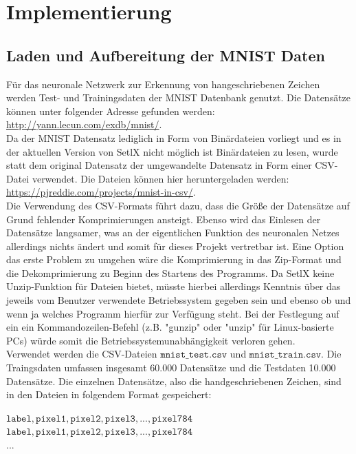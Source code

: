 \chapter{Implementierung}

\section{Laden und Aufbereitung der MNIST Daten}
Für das neuronale Netzwerk zur Erkennung von hangeschriebenen Zeichen werden Test- und Trainingsdaten der MNIST Datenbank genutzt. Die Datensätze können unter folgender Adresse gefunden werden: 
\\[0.2cm]
\hspace*{1.3cm}
\href{http://yann.lecun.com/exdb/mnist/}{http://yann.lecun.com/exdb/mnist/}.
\\[0.2cm]
Da der MNIST Datensatz lediglich in Form von Binärdateien vorliegt und es in der aktuellen Version von SetlX nicht möglich ist Binärdateien zu lesen, wurde statt dem original Datensatz der umgewandelte Datensatz in Form einer CSV-Datei verwendet. Die Dateien können hier heruntergeladen werden:
\\[0.2cm]
\hspace*{1.3cm}
\href{https://pjreddie.com/projects/mnist-in-csv/}{https://pjreddie.com/projects/mnist-in-csv/}.
\\[0.2cm]
Die Verwendung des CSV-Formats führt dazu, dass die Größe der Datensätze auf Grund fehlender Komprimierungen ansteigt. Ebenso wird das Einlesen der Datensätze langsamer, was an der eigentlichen Funktion des neuronalen Netzes allerdings nichts ändert und somit für dieses Projekt vertretbar ist. Eine Option das erste Problem zu umgehen wäre die Komprimierung in das Zip-Format und die Dekomprimierung zu Beginn des Startens des Programms. Da SetlX keine Unzip-Funktion für Dateien bietet, müsste hierbei allerdings Kenntnis über das jeweils vom Benutzer verwendete Betriebssystem gegeben sein und ebenso ob und wenn ja welches Programm hierfür zur Verfügung steht. Bei der Festlegung auf ein ein Kommandozeilen-Befehl (z.B. "gunzip" oder "unzip" für Linux-basierte PCs) würde somit die Betriebssystemunabhängigkeit verloren gehen.\\
Verwendet werden die CSV-Dateien $\mathtt{mnist\_test.csv}$ und $\mathtt{mnist\_train.csv}$. Die Traingsdaten umfassen insgesamt 60.000 Datensätze und die Testdaten 10.000 Datensätze. 
Die einzelnen Datensätze, also die handgeschriebenen Zeichen, sind in den Dateien in folgendem Format gespeichert:
\begin{center}
	$\mathtt{label, pixel1, pixel2, pixel3, ..., pixel784}$ \\
	$\mathtt{label, pixel1, pixel2, pixel3, ..., pixel784}$ \\
	...
\end{center}
